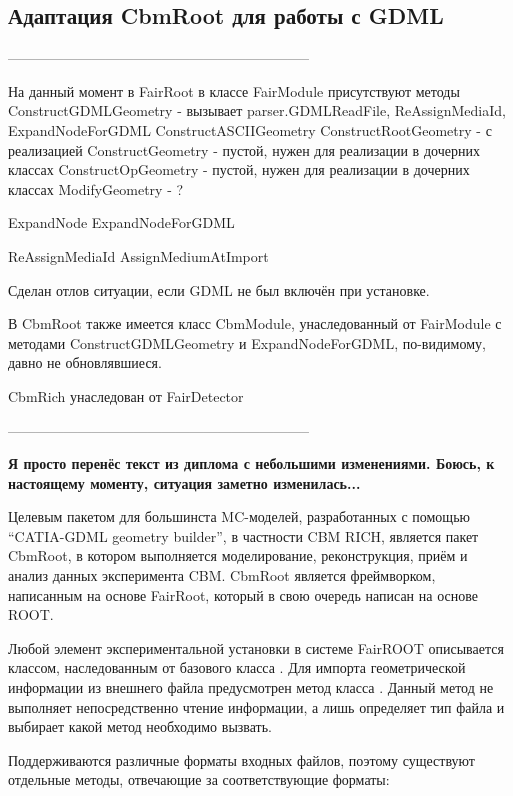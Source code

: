 \subsection{Адаптация CbmRoot для работы с GDML}\label{sec:secFairModule}

\todo -----------------------------------------------------------------

На данный момент в FairRoot в классе FairModule присутствуют методы
ConstructGDMLGeometry - вызывает parser.GDMLReadFile, ReAssignMediaId, ExpandNodeForGDML
ConstructASCIIGeometry
ConstructRootGeometry - с реализацией
ConstructGeometry - пустой, нужен для реализации в дочерних классах
ConstructOpGeometry - пустой, нужен для реализации в дочерних классах
ModifyGeometry - ? 

ExpandNode
ExpandNodeForGDML

ReAssignMediaId
AssignMediumAtImport

Сделан отлов ситуации, если GDML не был включён при установке.

В CbmRoot также имеется класс CbmModule, унаследованный от FairModule с методами ConstructGDMLGeometry и ExpandNodeForGDML, по-видимому, давно не обновлявшиеся.

CbmRich унаследован от FairDetector

\todo -----------------------------------------------------------------

\textbf{Я просто перенёс текст из диплома с небольшими изменениями. Боюсь, к настоящему моменту, ситуация заметно изменилась...}

Целевым пакетом для большинста MC-моделей, разработанных с помощью ``CATIA-GDML geometry builder'', в частности CBM RICH, является пакет CbmRoot, в котором выполняется моделирование, реконструкция, приём и анализ данных эксперимента CBM. CbmRoot является фреймворком, написанным на основе FairRoot, который в свою очередь написан на основе ROOT.

Любой элемент экспериментальной установки в системе FairROOT описывается классом, наследованным от базового класса . Для импорта геометрической информации из внешнего файла предусмотрен метод  класса . Данный метод не выполняет непосредственно чтение информации, а лишь определяет тип файла и выбирает какой метод необходимо вызвать.

Поддерживаются различные форматы входных файлов, поэтому существуют отдельные методы, отвечающие за соответствующие форматы:

